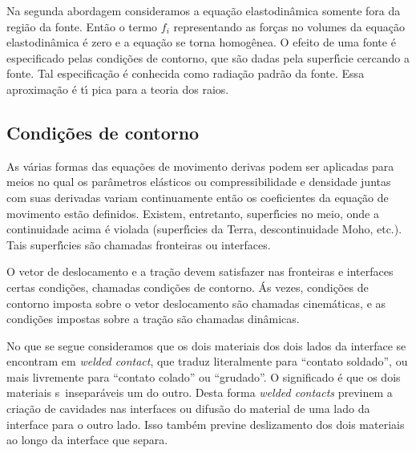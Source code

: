 Na segunda abordagem consideramos a equa\c{c}\~ao
elastodin\^amica somente fora da regi\~ao da fonte. Ent\~ao o
termo $f_{i}$ representando as for\c{c}as no volumes da
equa\c{c}\~ao elastodin\^amica \'e zero e a equa\c{c}\~ao se torna
homog\^enea. O efeito de uma fonte \'e especificado pelas
condi\c{c}\~oes de contorno, que s\~ao dadas pela superf\'\i cie
cercando a fonte. Tal especifica\c{c}\~ao \'e conhecida como
radia\c{c}\~ao padr\~ao da fonte. Essa aproxima\c{c}\~ao \'e t\'\i
pica para a teoria dos raios.

\subsection{Condi\c{c}\~oes de contorno}

As v\'arias formas das equa\c{c}\~oes de movimento derivas podem
ser aplicadas para meios no qual os par\^ametros el\'asticos  ou
compressibilidade e densidade juntas com suas derivadas variam
continuamente ent\~ao os coeficientes da equa\c{c}\~ao de
movimento est\~ao definidos. Existem, entretanto, superf\'\i cies
no meio, onde a continuidade acima \'e violada (superf\'\i cies da
Terra, descontinuidade Moho, etc.). Tais superf\'\i cies s\~ao
chamadas fronteiras ou interfaces.

O vetor de deslocamento e a tra\c{c}\~ao devem satisfazer nas fronteiras
e interfaces certas condi\c{c}\~oes, chamadas condi\c{c}\~oes de
contorno. \'As vezes, condi\c{c}\~oes de contorno imposta sobre o vetor
deslocamento s\~ao chamadas cinem\'aticas, e as condi\c{c}\~oes impostas
sobre a tra\c{c}\~ao s\~ao chamadas din\^amicas.

No que se segue consideramos que os dois materiais dos dois lados da
interface se encontram em {\em welded contact}, que traduz literalmente
para ``contato soldado'', ou mais livremente para ``contato colado'' ou
``grudado''. O significado \'e que os dois materiais s\ao\
insepar\'aveis um do outro. Desta forma {\em welded contacts} previnem a
cria\c{c}\~ao de cavidades nas interfaces ou difus\~ao do material de
uma lado da interface para o outro lado. Isso tamb\'em previne
deslizamento dos dois materiais ao longo da interface que separa.

